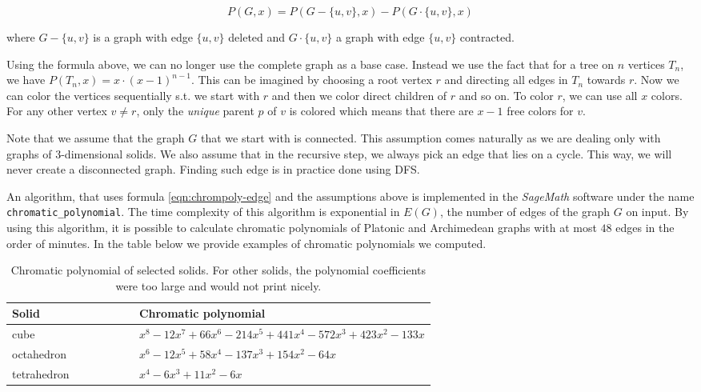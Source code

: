 \begin{equation}\label{eqn:chrompoly-edge}
    P(G,x) = P(G - \{u,v\},x) - P(G \cdot \{u,v\},x)
\end{equation}

where $G - \{u,v\}$ is a graph with edge $\{u,v\}$ deleted and $G \cdot \{u,v\}$ a graph with edge $\{u,v\}$ contracted. 

Using the formula above, we can no longer use the complete graph as a base case. Instead we use the fact that for a tree on $n$ vertices $T_n$, we have $P(T_n,x) = x \cdot (x-1)^{n-1}$. This can be imagined by choosing a root vertex $r$ and directing all edges in $T_n$ towards $r$. Now we can color the vertices sequentially s.t. we start with $r$ and then we color direct children of $r$ and so on. To color $r$, we can use all $x$ colors. For any other vertex $v \neq r$, only the \textit{unique} parent $p$ of $v$ is colored which means that there are $x-1$ free colors for $v$. 

Note that we assume that the graph $G$ that we start with is connected. This assumption comes naturally as we are dealing only with graphs of 3-dimensional solids. We also assume that in the recursive step, we always pick an edge that lies on a cycle. This way, we will never create a disconnected graph. Finding such edge is in practice done using DFS.

An algorithm, that uses formula \ref{eqn:chrompoly-edge} and the assumptions above is implemented in the \textit{SageMath} \cite{sagemath} software under the name \verb|chromatic_polynomial|. The time complexity of this algorithm is exponential in $E(G)$, the number of edges of the graph $G$ on input. By using this algorithm, it is possible to calculate chromatic polynomials of Platonic and Archimedean graphs with at most $48$ edges in the order of minutes. In the table below we provide examples of chromatic polynomials we computed.

\begin{table}[H]
\centering
\begin{tabular}{lp{0.7\linewidth}}
\toprule
\textbf{Solid} & \textbf{Chromatic polynomial} \\
\midrule
cube & $x^{8} - 12x^{7} + 66x^{6} - 214x^{5} + 441x^{4} - 572x^{3} + 423x^{2} - 133x$ \\
octahedron & $x^{6} - 12x^{5} + 58x^{4} - 137x^{3} + 154x^{2} - 64x$ \\
tetrahedron & $x^{4} - 6x^{3} + 11x^{2} - 6x$ \\
\bottomrule
\end{tabular}
\caption{Chromatic polynomial of selected solids. For other solids, the polynomial coefficients were too large and would not print nicely.}
\label{tab:selected-chrom-polys}
\end{table}



